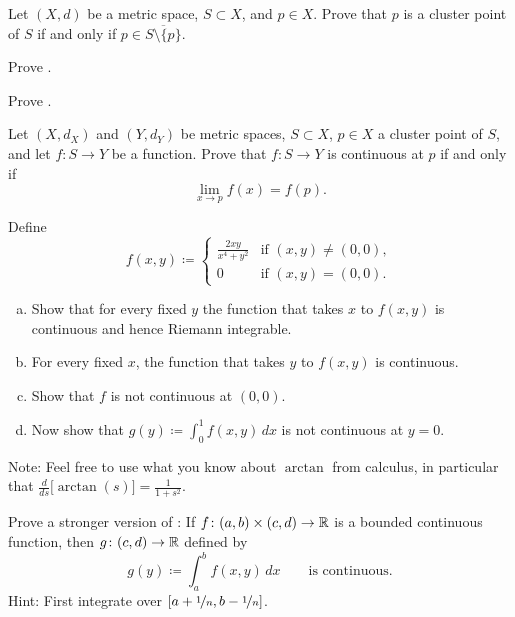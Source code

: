 \begin{exercise}
Let $(X,d)$ be a metric space, $S \subset X$, and $p \in X$.  Prove that
$p$ is a cluster point of $S$ if and only if $p \in \overline{S \setminus \{
p \}}$.
\end{exercise}

\begin{exercise}
Prove .
\end{exercise}

\begin{exercise}
Prove .
\end{exercise}

\begin{exercise}
Let $(X,d_X)$ and $(Y,d_Y)$ be metric spaces, $S \subset X$, $p \in X$
a cluster point of $S$, and let $f \colon S \to Y$ be a function.
Prove that
$f \colon S \to Y$ is continuous at $p$ if and only if
\begin{equation*}
\lim_{x \to p} f(x) = f(p) .
\end{equation*}
\end{exercise}

\begin{exercise}
Define
\begin{equation*}
f(x,y) \coloneqq
\begin{cases}
\frac{2xy}{x^4+y^2} & \text{if } (x,y) \not= (0,0), \\
0 & \text{if } (x,y) = (0,0) .
\end{cases}
\end{equation*}
\begin{enumerate}[a)]
\item
Show that for every fixed $y$ the function that takes $x$ to $f(x,y)$
is continuous and hence Riemann integrable.
\item
For every fixed $x$, the function that takes $y$ to $f(x,y)$ is continuous.
\item
Show that $f$ is not continuous at $(0,0)$.
\item
Now show that $g(y) \coloneqq \int_0^1 f(x,y)\,dx$ is not continuous at $y=0$.
\end{enumerate}
Note: Feel free to use what you know about $\arctan$ from calculus,
in particular that $\frac{d}{ds} \bigl[ \arctan(s) \bigr] = \frac{1}{1+s^2}$.
\end{exercise}

\begin{exercise} \label{exercise:integralcontcontextra}
Prove a stronger version of :
If $f \colon (a,b) \times (c,d) \to {\mathbb{R}}$ is a bounded continuous function,
then $g \colon (c,d) \to {\mathbb{R}}$ defined by
\begin{equation*}
g(y) \coloneqq \int_a^b f(x,y) \,dx  \qquad \text{is continuous}.
\end{equation*}
Hint: First integrate over $[a+\nicefrac{1}{n},b-\nicefrac{1}{n}]$.
\end{exercise}

